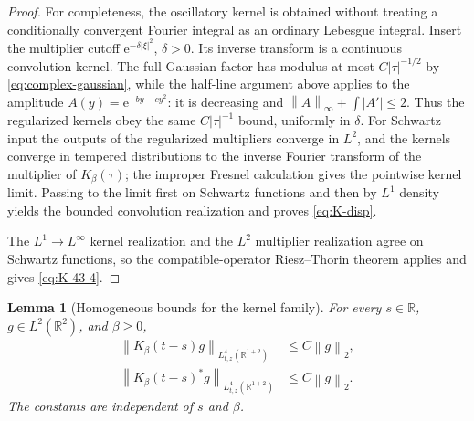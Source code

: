 \documentclass[11pt,oneside]{book}
\newtheorem{lemma}[theorem]{Lemma}
\theoremstyle{definition}
\theoremstyle{remark}
\newcommand{\R}{\mathbb R}
\newcommand{\1}{\mathbf 1}
\newcommand{\norm}[1]{\left\lVert #1\right\rVert}
\newcommand{\e}{\mathrm e}
\begin{document}
\begin{proof}
For completeness, the oscillatory kernel is obtained without treating a
conditionally convergent Fourier integral as an ordinary Lebesgue integral.
Insert the multiplier cutoff $\e^{-\delta|\xi|^2}$, $\delta>0$.  Its
inverse transform is a continuous convolution kernel.  The full Gaussian
factor has modulus at most $C|\tau|^{-1/2}$ by
\eqref{eq:complex-gaussian}, while the half-line argument above applies to
the amplitude $A(y)=\e^{-by-cy^2}$: it is decreasing and
$\norm A_\infty+\int|A'|\le2$.  Thus the regularized kernels obey the
same $C|\tau|^{-1}$ bound, uniformly in $\delta$.  For Schwartz input the outputs of the
regularized multipliers converge in $L^2$, and the kernels converge in
tempered distributions to the inverse Fourier transform of the multiplier
of $K_\beta(\tau)$; the improper Fresnel calculation gives
the pointwise kernel limit.  Passing to the limit first on Schwartz
functions and then by $L^1$ density yields the bounded convolution
realization and proves \eqref{eq:K-disp}.

The $L^1\to L^\infty$ kernel realization and the $L^2$ multiplier
realization agree on Schwartz functions, so the compatible-operator
Riesz--Thorin theorem applies and gives \eqref{eq:K-43-4}.
\end{proof}

\begin{lemma}[Homogeneous bounds for the kernel family]
\label{lem:K-homogeneous}
For every $s\in\R$, $g\in L^2(\R^2)$, and $\beta\ge0$,
\begin{align}
 \norm{K_\beta(t-s)g}_{L^4_{t,z}(\R^{1+2})}
 &\le C\norm g_2,                                  \label{eq:K-homogeneous}\\
 \norm{K_\beta(t-s)^*g}_{L^4_{t,z}(\R^{1+2})}
 &\le C\norm g_2.                                  \label{eq:K-adjoint-homogeneous}
\end{align}
The constants are independent of $s$ and $\beta$.
\end{lemma}
\end{document}

